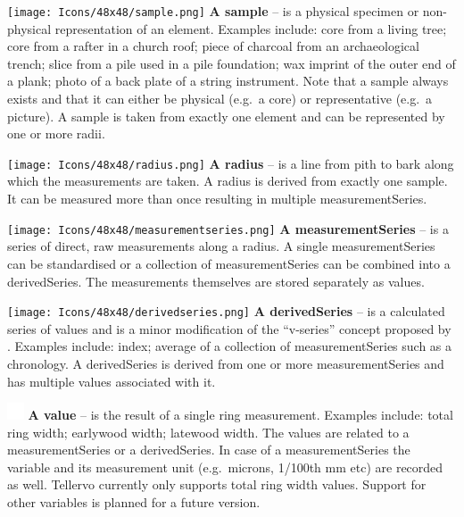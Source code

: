 \begin{description}
\item \texttt{[image: Icons/48x48/sample.png]} \textbf{A sample} -- is a physical specimen or non-physical representation of an element. Examples include: core from a living tree; core from a rafter in a church roof; piece of charcoal from an archaeological trench; slice from a pile used in a pile foundation; wax imprint of the outer end of a plank; photo of a back plate of a string instrument. Note that a sample always exists and that it can either be physical (e.g.\ a core) or representative (e.g.\ a picture). A sample is taken from exactly one element and can be represented by one or more radii.

\item \texttt{[image: Icons/48x48/radius.png]} \textbf{A radius} --  is a line from pith to bark along which the measurements are taken. A radius is derived from exactly one sample. It can be measured more than once resulting in multiple measurementSeries.

\item \texttt{[image: Icons/48x48/measurementseries.png]} \textbf{A measurementSeries} -- is a series of direct, raw measurements along a radius. A single measurementSeries can be standardised or a collection of measurementSeries can be combined into a derivedSeries.  The measurements themselves are stored separately as values.

\item \texttt{[image: Icons/48x48/derivedseries.png]} \textbf{A derivedSeries} -- is a calculated series of values and is a minor modification of the ``v-series'' concept proposed by \cite{corina}.  Examples include: index; average of a collection of measurementSeries such as a chronology. A derivedSeries is derived from one or more measurementSeries and has multiple values associated with it.

\item \includegraphics[width=5mm]{Images/pixel.png} \textbf{A value} --  is the result of a single ring measurement. Examples include: total ring width; earlywood width; latewood width. The values are related to a measurementSeries or a derivedSeries. In case of a measurementSeries the variable and its measurement unit (e.g.\ microns, 1/100th mm etc) are recorded as well.  Tellervo currently only supports total ring width values.  Support for other variables is planned for a future version.

\end{description}


